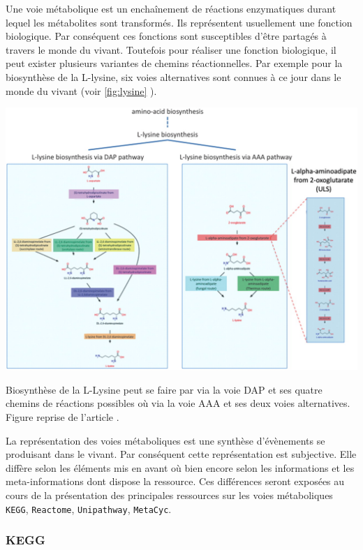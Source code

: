 \begin{refsegment}
    Une voie métabolique est un enchaînement de réactions enzymatiques durant lequel les métabolites sont transformés. Ils représentent usuellement une fonction biologique. Par conséquent ces fonctions sont susceptibles d'être partagés à travers le monde du vivant. Toutefois pour réaliser une fonction biologique, il peut exister plusieurs variantes de chemins réactionnelles. Par exemple pour la biosynthèse de la L-lysine, six voies alternatives sont connues à ce jour dans le monde du vivant (voir \cref{fig:lysine} ).
    	
    	
   	\begin{shadedfigure}[H]
   		\centering
   		\includegraphics[width=\textwidth]{img/L-lysine-biosynthesis.jpg}
   		\caption{Biosynthèse de la L-Lysine peut se faire par via la voie DAP et ses quatre chemins de réactions possibles où via la voie AAA et ses deux voies alternatives. Figure reprise de l'article . }
   		\label{fig:lysine}
   	\end{shadedfigure}
     
     La représentation des voies métaboliques est une synthèse d'évènements se produisant dans le vivant. Par conséquent cette représentation est subjective. Elle diffère selon les éléments mis en avant où bien encore selon les informations et les meta-informations dont dispose la ressource. Ces différences seront exposées au cours de la présentation des principales ressources sur les voies métaboliques \texttt{\gls{KEGG}}, \texttt{Reactome}, \texttt{Unipathway}, \texttt{MetaCyc}.
     
    \subsubsection{KEGG}
    

\end{refsegment}
